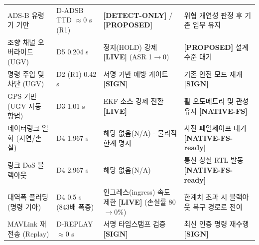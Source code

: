 \begin{table}[t!]
\begin{tabularx}{\textwidth}{@{} >{\raggedright\arraybackslash}p{3.8cm} >{\raggedright\arraybackslash}X >{\raggedright\arraybackslash}X >{\raggedright\arraybackslash}X @{}}
ADS-B 유령기 기만 & D-ADSB TTD $\approx$0 s (R1) & \textbf{[DETECT-ONLY]} / \textbf{[PROPOSED]} & 위협 개연성 판정 후 기존 임무 유지 \\
조향 채널 오버라이드 (UGV) & D5 0.204 s & 정지(HOLD) 강제 \textbf{[LIVE]} (ASR 1$\to$0) & \textbf{[PROPOSED]} 설계 수준 대기 \\
명령 주입 및 차단 (UGV) & D2 (R1) 0.42 s & 서명 기반 예방 게이트 \textbf{[SIGN]} & 기존 안전 모드 재개 \textbf{[SIGN]} \\
GPS 기만 (UGV 자동 항법) & D3 1.01 s & EKF 소스 강제 전환 \textbf{[LIVE]} & 휠 오도메트리 및 관성 유지 \textbf{[NATIVE-FS]} \\
데이터링크 열화 (지연/손실) & D4 1.967 s & 해당 없음(N/A) - 물리적 한계 명시 & 사전 페일세이프 대기 \textbf{[NATIVE-FS-ready]} \\
링크 DoS 블랙아웃 & D4 2.967 s & 해당 없음(N/A) & 통신 상실 RTL 발동 \textbf{[NATIVE-FS-ready]} \\
대역폭 플러딩 (명령 기아) & D4 0.5 s (843배 폭증) & 인그레스(ingress) 속도 제한 \textbf{[LIVE]} (손실률 80$\to$0\%) & 한계치 초과 시 블랙아웃 복구 경로로 전이 \\
MAVLink 재전송 (Replay) & D-REPLAY $\approx$0 s & 서명 타임스탬프 검증 \textbf{[SIGN]} & 최신 인증 명령 재수행 \textbf{[SIGN]} \\
\bottomrule
\end{tabularx}
\end{table}
